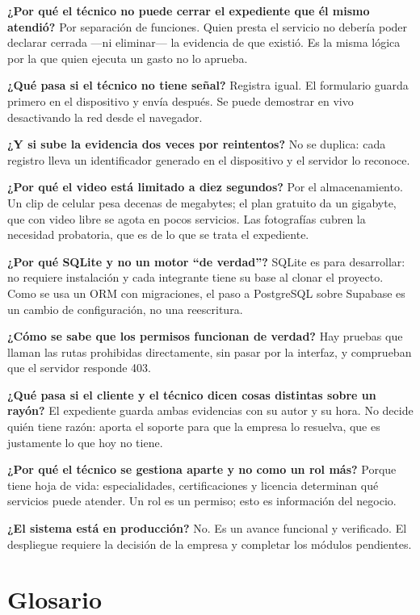 \textbf{¿Por qué el técnico no puede cerrar el expediente que él mismo atendió?}
Por separación de funciones. Quien presta el servicio no debería poder declarar
cerrada —ni eliminar— la evidencia de que existió. Es la misma lógica por la que
quien ejecuta un gasto no lo aprueba.

\textbf{¿Qué pasa si el técnico no tiene señal?} Registra igual. El formulario
guarda primero en el dispositivo y envía después. Se puede demostrar en vivo
desactivando la red desde el navegador.

\textbf{¿Y si sube la evidencia dos veces por reintentos?} No se duplica: cada
registro lleva un identificador generado en el dispositivo y el servidor lo
reconoce.

\textbf{¿Por qué el video está limitado a diez segundos?} Por el almacenamiento.
Un clip de celular pesa decenas de megabytes; el plan gratuito da un gigabyte, que
con video libre se agota en pocos servicios. Las fotografías cubren la necesidad
probatoria, que es de lo que se trata el expediente.

\textbf{¿Por qué SQLite y no un motor ``de verdad''?} SQLite es para desarrollar:
no requiere instalación y cada integrante tiene su base al clonar el proyecto.
Como se usa un ORM con migraciones, el paso a PostgreSQL sobre Supabase es un
cambio de configuración, no una reescritura.

\textbf{¿Cómo se sabe que los permisos funcionan de verdad?} Hay pruebas que
llaman las rutas prohibidas directamente, sin pasar por la interfaz, y comprueban
que el servidor responde 403.

\textbf{¿Qué pasa si el cliente y el técnico dicen cosas distintas sobre un
rayón?} El expediente guarda ambas evidencias con su autor y su hora. No decide
quién tiene razón: aporta el soporte para que la empresa lo resuelva, que es
justamente lo que hoy no tiene.

\textbf{¿Por qué el técnico se gestiona aparte y no como un rol más?} Porque tiene
hoja de vida: especialidades, certificaciones y licencia determinan qué servicios
puede atender. Un rol es un permiso; esto es información del negocio.

\textbf{¿El sistema está en producción?} No. Es un avance funcional y verificado.
El despliegue requiere la decisión de la empresa y completar los módulos
pendientes.

\section{Glosario}

